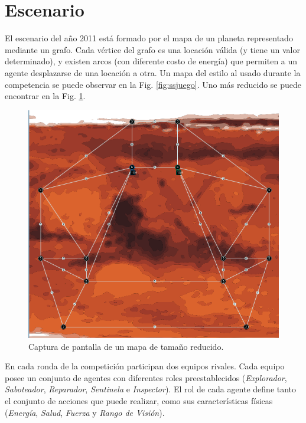 \section{Escenario}

El escenario del año 2011 está formado por el mapa de un planeta representado 
mediante un grafo. Cada vértice del grafo es una locación válida (y tiene un 
valor determinado), y existen arcos (con diferente costo de energía) que 
permiten a un agente desplazarse de una locación a otra. Un mapa del estilo
al usado durante la competencia se puede observar en la Fig. \ref{fig:ssjuego}.
Uno más reducido se puede encontrar en la Fig. \ref{fig:ssmapa}.

\begin{figure}
\centering
\includegraphics[width=\textwidth]{ssmapa.png}
\caption{Captura de pantalla de un mapa de tamaño reducido.}
\label{fig:ssmapa}
\end{figure}


En cada ronda de la competición participan dos equipos rivales. Cada equipo 
posee un conjunto de agentes con diferentes roles preestablecidos 
(\textit{Explorador}, \textit{Saboteador}, \textit{Reparador}, 
\textit{Sentinela} e \textit{Inspector}). El rol de cada agente define tanto 
el conjunto de acciones que puede realizar, como sus características físicas
(\textit{Energía}, \textit{Salud}, \textit{Fuerza} y \textit{Rango de Visión}).

